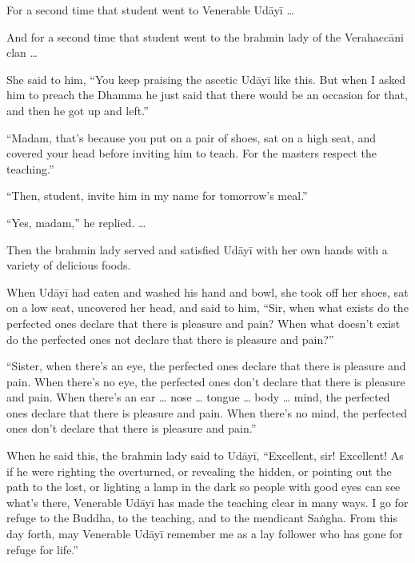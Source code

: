 \documentclass[12pt,openany]{book}%
\let\oldcontentsline\contentsline
\newcommand{\nopagecontentsline}[3]{\oldcontentsline{#1}{#2}{}}
\begin{document}
For a second time that student went to Venerable \textsanskrit{Udāyī} … 

And for a second time that student went to the brahmin lady of the \textsanskrit{Verahaccāni} clan … 

She said to him, “You keep praising the ascetic \textsanskrit{Udāyī} like this. But when I asked him to preach the Dhamma he just said that there would be an occasion for that, and then he got up and left.” 

“Madam, that’s because you put on a pair of shoes, sat on a high seat, and covered your head before inviting him to teach. For the masters respect the teaching.” 

“Then, student, invite him in my name for tomorrow’s meal.” 

“Yes, madam,” he replied. … 

Then the brahmin lady served and satisfied \textsanskrit{Udāyī} with her own hands with a variety of delicious foods. 

When \textsanskrit{Udāyī} had eaten and washed his hand and bowl, she took off her shoes, sat on a low seat, uncovered her head, and said to him, “Sir, when what exists do the perfected ones declare that there is pleasure and pain? When what doesn’t exist do the perfected ones not declare that there is pleasure and pain?” 

“Sister, when there’s an eye, the perfected ones declare that there is pleasure and pain. When there’s no eye, the perfected ones don’t declare that there is pleasure and pain. When there’s an ear … nose … tongue … body … mind, the perfected ones declare that there is pleasure and pain. When there’s no mind, the perfected ones don’t declare that there is pleasure and pain.” 

When he said this, the brahmin lady said to \textsanskrit{Udāyī}, “Excellent, sir! Excellent! As if he were righting the overturned, or revealing the hidden, or pointing out the path to the lost, or lighting a lamp in the dark so people with good eyes can see what’s there, Venerable \textsanskrit{Udāyī} has made the teaching clear in many ways. I go for refuge to the Buddha, to the teaching, and to the mendicant \textsanskrit{Saṅgha}. From this day forth, may Venerable \textsanskrit{Udāyī} remember me as a lay follower who has gone for refuge for life.” 

%
\end{document}
